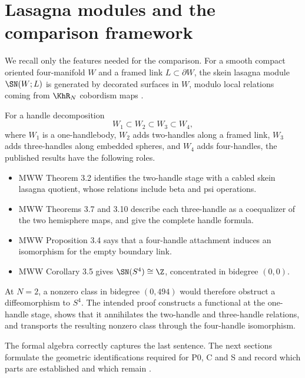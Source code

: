 \section{Lasagna modules and the comparison framework}

We recall only the features needed for the comparison.  For a smooth
compact oriented four-manifold $W$ and a framed link $L\subset\partial W$,
the skein lasagna module $\SN(W;L)$ is generated by decorated surfaces in
$W$, modulo local relations coming from $\KhR_N$ cobordism maps
\cite{MorrisonWalkerWedrich2019,ManolescuWalkerWedrich2023}.

For a handle decomposition
\[
W_1\subset W_2\subset W_3\subset W_4,
\]
where $W_1$ is a one-handlebody, $W_2$ adds two-handles along a framed link,
$W_3$ adds three-handles along embedded spheres, and $W_4$ adds four-handles,
the published results have the following roles.
\begin{itemize}
\item MWW Theorem 3.2 identifies the two-handle stage with a cabled skein
lasagna quotient, whose relations include beta and psi operations.
\item MWW Theorems 3.7 and 3.10 describe each three-handle as a coequalizer
of the two hemisphere maps, and give the complete handle formula.
\item MWW Proposition 3.4 says that a four-handle attachment induces an
isomorphism for the empty boundary link.
\item MWW Corollary 3.5 gives
$\SN(S^4)\cong\Z$, concentrated in bidegree $(0,0)$.
\end{itemize}

At $N=2$, a nonzero class in bidegree $(0,494)$ would therefore obstruct a
diffeomorphism to $S^4$.  The intended proof constructs a functional at the
one-handle stage, shows that it annihilates the two-handle and three-handle
relations, and transports the resulting nonzero class through the
four-handle isomorphism.

The formal algebra correctly captures the last sentence.  The next sections
formulate the geometric identifications required for P0, C and S and record
which parts are established and which remain \Open.

